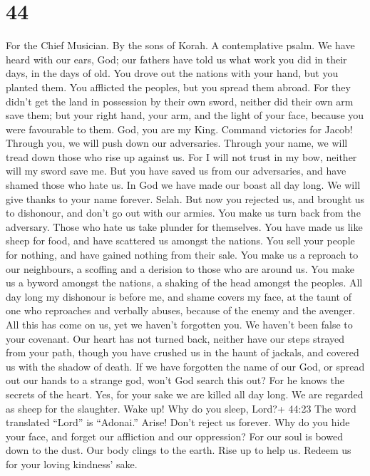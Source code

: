 \hypertarget{section-43}{%
\section{44}\label{section-43}}

For the Chief Musician. By the sons of Korah. A contemplative psalm.
 We have heard with our ears, God; our fathers have told us
what work you did in their days, in the days of old.  You
drove out the nations with your hand, but you planted them. You
afflicted the peoples, but you spread them abroad.  For they
didn't get the land in possession by their own sword, neither did their
own arm save them; but your right hand, your arm, and the light of your
face, because you were favourable to them.  God, you are my
King. Command victories for Jacob!  Through you, we will
push down our adversaries. Through your name, we will tread down those
who rise up against us.  For I will not trust in my bow,
neither will my sword save me.  But you have saved us from
our adversaries, and have shamed those who hate us.  In God
we have made our boast all day long. We will give thanks to your name
forever. Selah.  But now you rejected us, and brought us to
dishonour, and don't go out with our armies.  You make us
turn back from the adversary. Those who hate us take plunder for
themselves.  You have made us like sheep for food, and have
scattered us amongst the nations.  You sell your people for
nothing, and have gained nothing from their sale.  You make
us a reproach to our neighbours, a scoffing and a derision to those who
are around us.  You make us a byword amongst the nations, a
shaking of the head amongst the peoples.  All day long my
dishonour is before me, and shame covers my face,  at the
taunt of one who reproaches and verbally abuses, because of the enemy
and the avenger.  All this has come on us, yet we haven't
forgotten you. We haven't been false to your covenant.  Our
heart has not turned back, neither have our steps strayed from your
path,  though you have crushed us in the haunt of jackals,
and covered us with the shadow of death.  If we have
forgotten the name of our God, or spread out our hands to a strange god,
 won't God search this out? For he knows the secrets of the
heart.  Yes, for your sake we are killed all day long. We
are regarded as sheep for the slaughter.  Wake up! Why do
you sleep, Lord?+ 44:23 The word translated ``Lord'' is ``Adonai.''
Arise! Don't reject us forever.  Why do you hide your face,
and forget our affliction and our oppression?  For our soul
is bowed down to the dust. Our body clings to the earth. 
Rise up to help us. Redeem us for your loving kindness' sake.

